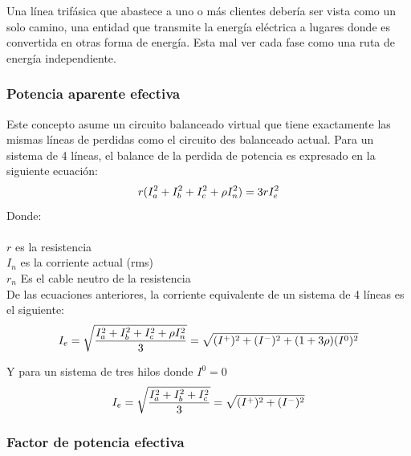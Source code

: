 Una línea trifásica que abastece a uno o más clientes debería ser vista como un solo camino, una entidad que transmite la energía eléctrica a lugares donde es convertida en otras forma de energía. Esta mal ver cada fase como una ruta de energía independiente.\cite{A30}\\

\subsubsection{Potencia aparente efectiva}

Este concepto asume un circuito balanceado virtual que tiene exactamente las mismas líneas de perdidas como el circuito des balanceado actual. Para un sistema de 4 líneas, el balance de la perdida de potencia es expresado en la siguiente ecuación:\cite{A30}\\

\begin{equation}\label{EQ55}
r(I^2_{a}+I^2_{b}+I^2_{c}+\rho I^2_{n})=3rI^2_{e}\\
\end{equation}
Donde:\\\\
$r$			es la resistencia\\
$I_{n}$		es la corriente actual (rms)\\
$r_{n}$		Es el cable neutro de la resistencia\\

De las ecuaciones anteriores, la corriente equivalente de un sistema de 4 líneas es el siguiente:\\

\begin{equation}\label{EQ56}
I_{e}=\sqrt{\frac{I^2_{a}+I^2_{b}+I^2_{c}+\rho I^2_{n}}{3}}=\sqrt{(I^+)^2+(I^-)^2+(1+3\rho)(I^0)^2}\\
\end{equation}

Y para un sistema de tres hilos donde $I^0=0$\\

\begin{equation}\label{EQ57}
I_{e}=\sqrt{\frac{I^2_{a}+I^2_{b}+I^2_{c}}{3}}=\sqrt{(I^+)^2+(I^-)^2}\\
\end{equation}

\subsubsection{Factor de potencia efectiva}


